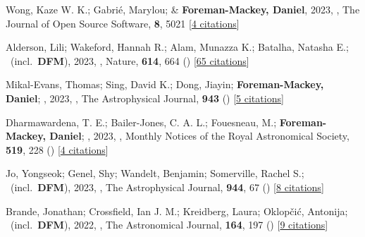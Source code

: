 \item[{\color{numcolor}\scriptsize94}] Wong, Kaze W. K.; Gabri{\'e}, Marylou; \& \textbf{Foreman-Mackey, Daniel}, 2023, , The Journal of Open Source Software, \textbf{8}, 5021 [\href{https://ui.adsabs.harvard.edu/abs/2023JOSS....8.5021W}{4 citations}]

\item[{\color{numcolor}\scriptsize93}] Alderson, Lili; Wakeford, Hannah R.; Alam, Munazza K.; Batalha, Natasha E.; \etal\ (incl.\ \textbf{DFM}), 2023, , Nature, \textbf{614}, 664 () [\href{https://ui.adsabs.harvard.edu/abs/2023Natur.614..664A}{65 citations}]

\item[{\color{numcolor}\scriptsize92}] Mikal-Evans, Thomas; Sing, David K.; Dong, Jiayin; \textbf{Foreman-Mackey, Daniel}; \etal, 2023, , The Astrophysical Journal, \textbf{943} () [\href{https://ui.adsabs.harvard.edu/abs/2023ApJ...943L..17M}{5 citations}]

\item[{\color{numcolor}\scriptsize91}] Dharmawardena, T. E.; Bailer-Jones, C. A. L.; Fouesneau, M.; \textbf{Foreman-Mackey, Daniel}; \etal, 2023, , Monthly Notices of the Royal Astronomical Society, \textbf{519}, 228 () [\href{https://ui.adsabs.harvard.edu/abs/2023MNRAS.519..228D}{4 citations}]

\item[{\color{numcolor}\scriptsize90}] Jo, Yongseok; Genel, Shy; Wandelt, Benjamin; Somerville, Rachel S.; \etal\ (incl.\ \textbf{DFM}), 2023, , The Astrophysical Journal, \textbf{944}, 67 () [\href{https://ui.adsabs.harvard.edu/abs/2023ApJ...944...67J}{8 citations}]

\item[{\color{numcolor}\scriptsize89}] Brande, Jonathan; Crossfield, Ian J. M.; Kreidberg, Laura; Oklop{\v{c}}i{\'c}, Antonija; \etal\ (incl.\ \textbf{DFM}), 2022, , The Astronomical Journal, \textbf{164}, 197 () [\href{https://ui.adsabs.harvard.edu/abs/2022AJ....164..197B}{9 citations}]

